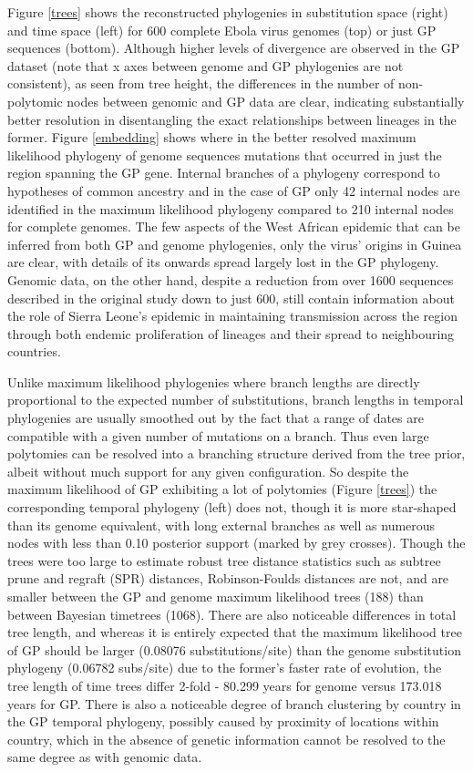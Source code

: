 \documentclass[11pt,oneside,letterpaper]{article}
\begin{document}
Figure \ref{trees} shows the reconstructed phylogenies in substitution space (right) and time space (left) for 600 complete Ebola virus genomes (top) or just GP sequences (bottom).
Although higher levels of divergence are observed in the GP dataset (note that x axes between genome and GP phylogenies are not consistent), as seen from tree height, the differences in the number of non-polytomic nodes between genomic and GP data are clear, indicating substantially better resolution in disentangling the exact relationships between lineages in the former.
Figure \ref{embedding} shows where in the better resolved maximum likelihood phylogeny of genome sequences mutations that occurred in just the region spanning the GP gene.
Internal branches of a phylogeny correspond to hypotheses of common ancestry and in the case of GP only 42 internal nodes are identified in the maximum likelihood phylogeny compared to 210 internal nodes for complete genomes.
The few aspects of the West African epidemic that can be inferred from both GP and genome phylogenies, only the virus' origins in Guinea are clear, with details of its onwards spread largely lost in the GP phylogeny.
Genomic data, on the other hand, despite a reduction from over 1600 sequences described in the original study \citep{dudas_virus_2017} down to just 600, still contain information about the role of Sierra Leone's epidemic in maintaining transmission across the region through both endemic proliferation of lineages and their spread to neighbouring countries.

Unlike maximum likelihood phylogenies where branch lengths are directly proportional to the expected number of substitutions, branch lengths in temporal phylogenies are usually smoothed out by the fact that a range of dates are compatible with a given number of mutations on a branch.
Thus even large polytomies can be resolved into a branching structure derived from the tree prior, albeit without much support for any given configuration.
So despite the maximum likelihood of GP exhibiting a lot of polytomies (Figure \ref{trees}) the corresponding temporal phylogeny (left) does not, though it is more star-shaped than its genome equivalent, with long external branches as well as numerous nodes with less than 0.10 posterior support (marked by grey crosses).
Though the trees were too large to estimate robust tree distance statistics such as subtree prune and regraft (SPR) distances, Robinson-Foulds distances are not, and are smaller between the GP and genome maximum likelihood trees (188) than between Bayesian timetrees (1068).
There are also noticeable differences in total tree length, and whereas it is entirely expected that the maximum likelihood tree of GP should be larger (0.08076 substitutions/site) than the genome substitution phylogeny (0.06782 subs/site) due to the former's faster rate of evolution, the tree length of time trees differ 2-fold - 80.299 years for genome versus 173.018 years for GP.
There is also a noticeable degree of branch clustering by country in the GP temporal phylogeny, possibly caused by proximity of locations within country, which in the absence of genetic information cannot be resolved to the same degree as with genomic data.
\end{document}
